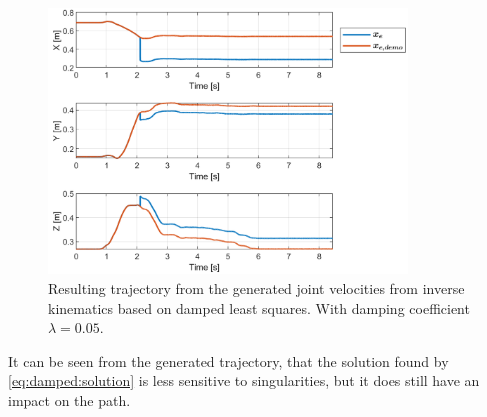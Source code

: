 \documentclass[../main.tex]{subfiles}
\begin{document}
\begin{figure}[H]
    \centering
         \includegraphics[width=0.85\textwidth]{figures/linkcollision/inversekin_damped_problem.png}
     \caption{Resulting trajectory from the generated joint velocities from inverse kinematics based on damped least squares. With damping coefficient $\lambda = 0.05$.}
     \label{fig:link:damped:problem}
\end{figure}
It can be seen from the generated trajectory, that the solution found by \autoref{eq:damped:solution} is less sensitive to singularities, but it does still have an impact on the path.
\end{document}
